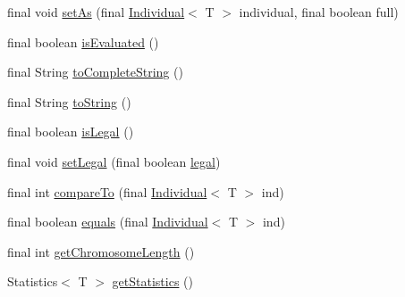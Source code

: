 \begin{DoxyCompactItemize}
\item 
final void \hyperlink{classjenes_1_1population_1_1_individual_3_01_t_01extends_01_chromosome_01_4_a5d41ad20ea167e591b4df69883e3ab84}{set\-As} (final \hyperlink{classjenes_1_1population_1_1_individual_3_01_t_01extends_01_chromosome_01_4_aaef7161bf62cee0ac95f079394fdac9f}{Individual}$<$ T $>$ individual, final boolean full)
\item 
final boolean \hyperlink{classjenes_1_1population_1_1_individual_3_01_t_01extends_01_chromosome_01_4_a90f222f30e37b23c0c3aceffd4571cfa}{is\-Evaluated} ()
\item 
final String \hyperlink{classjenes_1_1population_1_1_individual_3_01_t_01extends_01_chromosome_01_4_aeea71cba0872f34f4097e882b5debf64}{to\-Complete\-String} ()
\item 
final String \hyperlink{classjenes_1_1population_1_1_individual_3_01_t_01extends_01_chromosome_01_4_a705d4c4407ca6e33ae5b500fb192ced0}{to\-String} ()
\item 
final boolean \hyperlink{classjenes_1_1population_1_1_individual_3_01_t_01extends_01_chromosome_01_4_adcfca83cfc369ef8a3fcabe9bda4de1f}{is\-Legal} ()
\item 
final void \hyperlink{classjenes_1_1population_1_1_individual_3_01_t_01extends_01_chromosome_01_4_aabb4dbbc582544a12932ec7c42a2ec78}{set\-Legal} (final boolean \hyperlink{classjenes_1_1population_1_1_individual_3_01_t_01extends_01_chromosome_01_4_a0775108a26a06ac9d9fe4aea63bd5709}{legal})
\item 
final int \hyperlink{classjenes_1_1population_1_1_individual_3_01_t_01extends_01_chromosome_01_4_a4cc0f0feb3da7cc54bb44e881006d39a}{compare\-To} (final \hyperlink{classjenes_1_1population_1_1_individual_3_01_t_01extends_01_chromosome_01_4_aaef7161bf62cee0ac95f079394fdac9f}{Individual}$<$ T $>$ ind)
\item 
final boolean \hyperlink{classjenes_1_1population_1_1_individual_3_01_t_01extends_01_chromosome_01_4_acffe4b1590048fb780b637716fad6db6}{equals} (final \hyperlink{classjenes_1_1population_1_1_individual_3_01_t_01extends_01_chromosome_01_4_aaef7161bf62cee0ac95f079394fdac9f}{Individual}$<$ T $>$ ind)
\item 
final int \hyperlink{classjenes_1_1population_1_1_individual_3_01_t_01extends_01_chromosome_01_4_a78847299c79de4cde6aec341a406e80c}{get\-Chromosome\-Length} ()
\item 
Statistics$<$ T $>$ \hyperlink{classjenes_1_1population_1_1_individual_3_01_t_01extends_01_chromosome_01_4_acdf2d55195f6068913e5487b0542952a}{get\-Statistics} ()
\end{DoxyCompactItemize}
